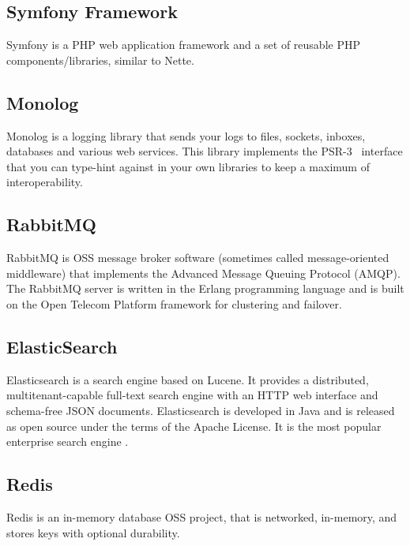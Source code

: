 \subsection{Symfony Framework} \label{sec:theory:symfony}

Symfony is a PHP web application framework and a set of reusable PHP components/libraries, similar to Nette.~\cite{wiki:symfony}

\subsection{Monolog} \label{sec:theory:monolog}

Monolog is a logging library that sends your logs to files, sockets, inboxes, databases and various web services. This library implements the PSR-3~\cite{fig:psr} interface that you can type-hint against in your own libraries to keep a maximum of interoperability.~\cite{monolog:readme}

\subsection{RabbitMQ} \label{sec:theory:rabbitmq}

RabbitMQ is OSS message broker software (sometimes called message-oriented middleware) that implements the Advanced Message Queuing Protocol (AMQP). The RabbitMQ server is written in the Erlang programming language and is built on the Open Telecom Platform framework for clustering and failover.~\cite{wiki:rabbitmq}

\subsection{ElasticSearch} \label{sec:theory:elasticsearch}

Elasticsearch is a search engine based on Lucene. It provides a distributed, multitenant-capable full-text search engine with an HTTP web interface and schema-free JSON documents. Elasticsearch is developed in Java and is released as open source under the terms of the Apache License. It is the most popular enterprise search engine .~\cite{wiki:elasticsearch}

\subsection{Redis} \label{sec:theory:redis}

Redis is an in-memory database OSS project, that is networked, in-memory, and stores keys with optional durability.~\cite{wiki:redis}

